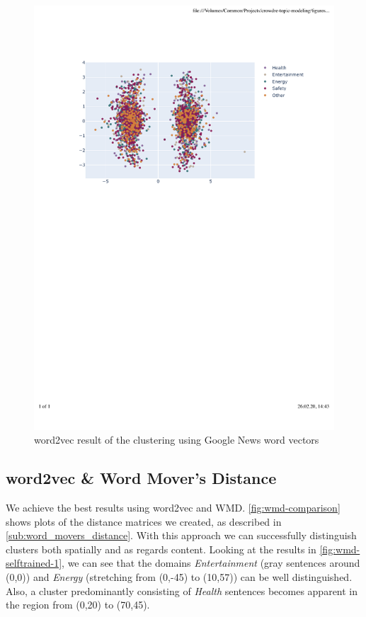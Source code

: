 \begin{figure}[ht]
  \begin{center}
    \includegraphics[width=\textwidth]{figures/word2vec_pretrained_pca-legend.pdf}
    \caption{word2vec result of the clustering using Google News word vectors}
    \label{fig:w2v-pretrained-4}
  \end{center}
\end{figure}
\FloatBarrier

\subsection{word2vec \& Word Mover's Distance} %
\label{sub:findings_wmd}
We achieve the best results using word2vec and WMD. \autoref{fig:wmd-comparison} shows plots of the distance matrices we created, as described in \autoref{sub:word_movers_distance}. With this approach we can successfully distinguish clusters both spatially and as regards content. Looking at the results in \autoref{fig:wmd-selftrained-1}, we can see that the domains \textit{Entertainment} (gray sentences around (0,0)) and \textit{Energy} (stretching from (0,-45) to (10,57)) can be well distinguished. Also, a cluster predominantly consisting of \textit{Health} sentences becomes apparent in the region from (0,20) to (70,45).\\

